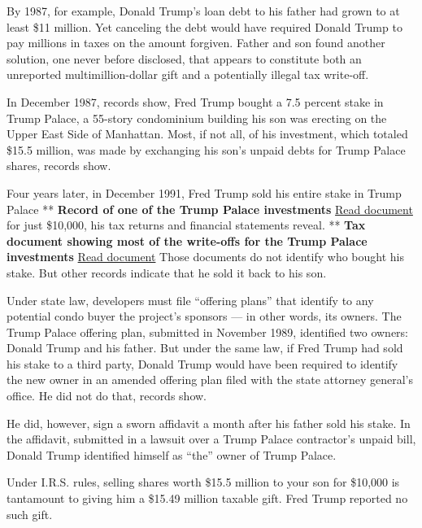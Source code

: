By 1987, for example, Donald Trump's loan debt to his father had grown
to at least \$11 million. Yet canceling the debt would have required
Donald Trump to pay millions in taxes on the amount forgiven. Father and
son found another solution, one never before disclosed, that appears to
constitute both an unreported multimillion-dollar gift and a potentially
illegal tax write-off.

In December 1987, records show, Fred Trump bought a 7.5 percent stake in
Trump Palace, a 55-story condominium building his son was erecting on
the Upper East Side of Manhattan. Most, if not all, of his investment,
which totaled \$15.5 million, was made by exchanging his son's unpaid
debts for Trump Palace shares, records show.

Four years later, in December 1991, Fred Trump sold his entire stake in
Trump Palace ** \textbf{Record of one of the Trump Palace investments}
\href{https://int.graylady3jvrrxbe.onion/data/documenthelper/136-trump-palace-sussex-hall/8743f02a6c559ca84022/optimized/full.pdf\#page=1}{Read
document} for just \$10,000, his tax returns and financial statements
reveal. ** \textbf{Tax document showing most of the write-offs for the
Trump Palace investments}
\href{https://int.graylady3jvrrxbe.onion/data/documenthelper/281-trump-palace-fred-trump-1991/75834079e4ada8981806/optimized/full.pdf\#page=1}{Read
document} Those documents do not identify who bought his stake. But
other records indicate that he sold it back to his son.

Under state law, developers must file ``offering plans'' that identify
to any potential condo buyer the project's sponsors --- in other words,
its owners. The Trump Palace offering plan, submitted in November 1989,
identified two owners: Donald Trump and his father. But under the same
law, if Fred Trump had sold his stake to a third party, Donald Trump
would have been required to identify the new owner in an amended
offering plan filed with the state attorney general's office. He did not
do that, records show.

He did, however, sign a sworn affidavit a month after his father sold
his stake. In the affidavit, submitted in a lawsuit over a Trump Palace
contractor's unpaid bill, Donald Trump identified himself as ``the''
owner of Trump Palace.

Under I.R.S. rules, selling shares worth \$15.5 million to your son for
\$10,000 is tantamount to giving him a \$15.49 million taxable gift.
Fred Trump reported no such gift.

